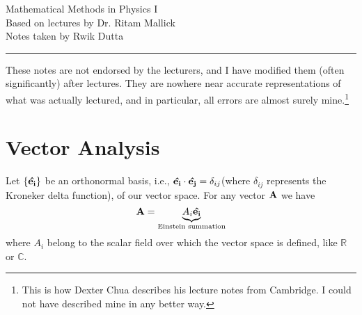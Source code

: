 \documentclass[10pt, a4paper]{extarticle}
\theoremstyle{definition}
\begin{document}
\begin{center}
	\fontsize{25}{60}\selectfont Mathematical Methods in Physics I \\
	\large Based on lectures by Dr. Ritam Mallick\\
	Notes taken by Rwik Dutta
\end{center}
\hrule
\begin{center}
	These notes are not endorsed by the lecturers, and I have modified them (often
	significantly) after lectures. They are nowhere near accurate representations of what
	was actually lectured, and in particular, all errors are almost surely mine.\footnote[1]{This is how Dexter Chua describes his lecture notes from Cambridge. I could not have described mine in any better way.}
\end{center}
\tableofcontents

\newpage

\section{Vector Analysis}
Let $\{\vu{e_i}\}$ be an orthonormal basis, i.e., $\vu{e_i}\cdot\vu{e_j}=\delta_{ij}$(where $\delta_{ij}$ represents the Kroneker delta function), of our vector space. For any vector $\vb{A}$ we have
\[\vb{A}=\underbrace{A_i\vu{e_i}}_{\text{Einstein summation}}\]
where $A_i$ belong to the scalar field over which the vector space is defined, like $\mathbb{R}$ or $\mathbb{C}$.
\end{document}
